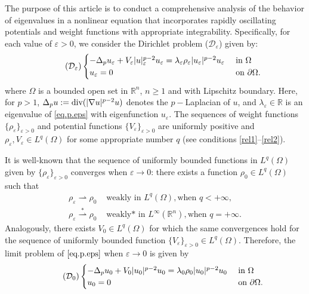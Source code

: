 \documentclass[12pt]{amsart}
\theoremstyle{definition}
\theoremstyle{remark}
\numberwithin{equation}{section}
\begin{document}
The purpose of this article is to conduct a comprehensive analysis of the behavior of eigenvalues in a nonlinear equation that incorporates rapidly oscillating potentials and weight functions with appropriate integrability.  Specifically, for each value of $\varepsilon > 0$, we consider the Dirichlet problem ($\mathcal{D}_\varepsilon$) given by:
\begin{align}\tag{$\mathcal{D}_\varepsilon$}   \label{eq.p.eps} 
\begin{cases}
-\Delta_p u_\varepsilon + V_\varepsilon |u|_\varepsilon^{p-2} u_\varepsilon= \lambda_\varepsilon \rho_\varepsilon |u_\varepsilon|^{p-2}u_\varepsilon &\text{ in } \Omega\\
u_\varepsilon=0 & \text{ on } \partial\Omega.
\end{cases}
\end{align}
where $\Omega$ is a bounded open set in $\mathbb R^n$,  $n\geq 1$ and with Lipschitz boundary.  Here, for $p>1$, $\Delta_p u :=\mathop{\text{\normalfont div}}(|\nabla u|^{p-2} u)$ denotes the $p-$Laplacian of $u$, and $\lambda_\varepsilon\in \mathbb R$ is an eigenvalue of \eqref{eq.p.eps} with eigenfunction $u_\varepsilon$. The sequences of weight functions $\{\rho_\varepsilon\}_{\varepsilon>0}$ and potential functions $\{V_\varepsilon\}_{\varepsilon>0}$ are uniformly positive  and $\rho_\varepsilon,V_\varepsilon \in L^q(\Omega)$ for  some appropriate number $q$ (see conditions \eqref{rel1}--\eqref{rel2}).

It is well-known that the sequence of uniformly bounded functions in $L^q(\Omega)$ given by $\{\rho_\varepsilon\}_{\varepsilon>0}$ converges when $\varepsilon \to 0$: there exists a function $\rho_0\in L^q(\Omega)$ such that
\begin{align*}
\rho_\varepsilon \rightharpoonup \rho_0 &\text{ weakly in  } L^q(\Omega), \text{when }q<+\infty,\\
\rho_\varepsilon \stackrel{*}{\rightharpoonup} \rho_0 &\text{ weakly* in  } L^\infty(\mathbb R^n), \text{when }q=+\infty.
\end{align*}
Analogously, there exists $V_0\in L^q(\Omega)$ for which the same convergences hold for the sequence of uniformly bounded function $\{V_\varepsilon\}_{\varepsilon>0}\in L^q(\Omega)$. Therefore, the limit problem of $\eqref{eq.p.eps}$ when $\varepsilon\to 0$ is  given by
\begin{align}\tag{$\mathcal{D}_0$}   \label{eq.p.0} 
\begin{cases}
-\Delta_p u_0 +  V_0 |u_0|^{p-2}u_0 = \lambda_0 \rho_0 |u_0|^{p-2}u_0 &\text{ in } \Omega\\
u_0=0 & \text{ on } \partial\Omega.
\end{cases}
\end{align}
\end{document}
